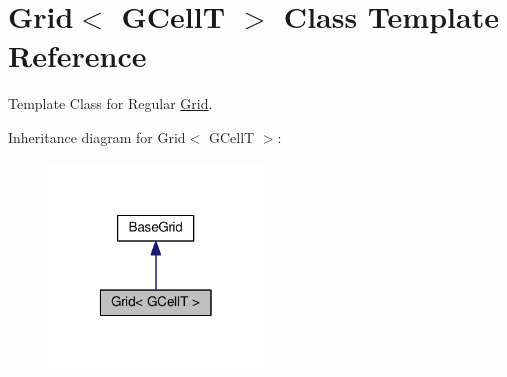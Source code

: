 \hypertarget{classKatabatic_1_1Grid}{}\section{Grid$<$ G\+CellT $>$ Class Template Reference}
\label{classKatabatic_1_1Grid}


Template Class for Regular \mbox{\hyperlink{classKatabatic_1_1Grid}{Grid}}.  




Inheritance diagram for Grid$<$ G\+CellT $>$\+:\nopagebreak
\begin{figure}[H]
\begin{center}
\leavevmode
\includegraphics[width=162pt]{classKatabatic_1_1Grid__inherit__graph}
\end{center}
\end{figure}
